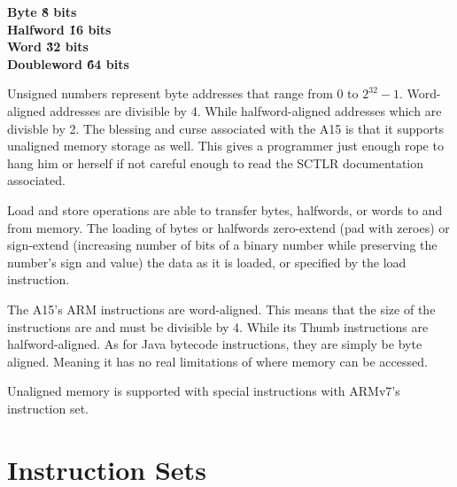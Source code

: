 \documentclass[12pt]{scrreprt}
\begin{document}

	\begin{center}
		\bfseries Byte \' 8 bits\\
		\bfseries Halfword \' 16 bits\\
		\bfseries Word \' 32 bits\\
		\bfseries Doubleword \' 64 bits\\
	\end{center}

	Unsigned numbers represent byte addresses that range from 0 to $2^{32}-1$.
	Word-aligned addresses are divisible by 4.
	While halfword-aligned addresses which are divisble by 2.
	The blessing and curse associated with the A15 is that it supports unaligned memory storage as well.
	This gives a programmer just enough rope to hang him or herself if not careful enough to read the SCTLR documentation associated.


	Load and store operations are able to transfer bytes, halfwords, or words to and from memory. The loading of bytes or halfwords zero-extend
	(pad with zeroes) or sign-extend (increasing number of bits of a binary number while preserving the number's sign and value) the data as it is loaded, or specified by the load instruction.

	The A15's ARM instructions are word-aligned. This means that the size of the instructions are and must be divisible by 4.
	While its Thumb instructions are halfword-aligned.
	As for Java bytecode instructions, they are simply be byte aligned.
	Meaning it has no real limitations of where memory can be accessed.

	Unaligned memory is supported with special instructions with ARMv7's instruction set.



{\let\clearpage\relax\chapter{Instruction Sets}}
\end{document}
